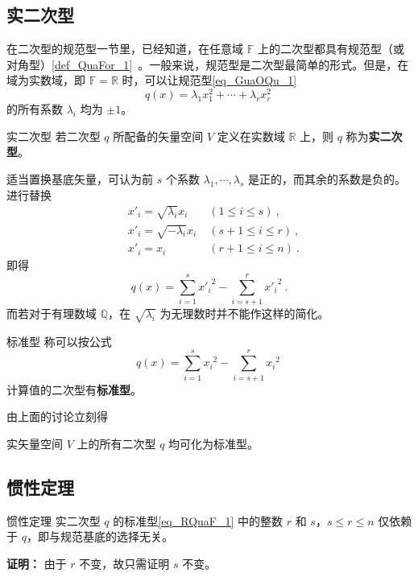 

\subsection{实二次型}
在二次型的规范型一节里，已经知道，在任意域 $\mathbb F$ 上的二次型都具有规范型（或对角型）\autoref{def_QuaFor_1}~。一般来说，规范型是二次型最简单的形式。但是，在域为实数域，即 $\mathbb F=\mathbb R$ 时，可以让规范型\autoref{eq_GuaOQu_1}~
\begin{equation}
q({x})=\lambda_1 x_1^2+\cdots+\lambda_r x_r^2~
\end{equation}
的所有系数 $\lambda_i$ 均为 $\pm 1$。
\begin{definition}{实二次型}
若二次型 $q$ 所配备的矢量空间 $V$ 定义在实数域 $\mathbb R$ 上，则 $q$ 称为\textbf{实二次型}。
\end{definition}
适当置换基底矢量，可认为前 $s$ 个系数 $\lambda_1,\cdots,\lambda_s$ 是正的，而其余的系数是负的。进行替换
\begin{equation}
\begin{aligned}
&x'_i=\sqrt{\lambda_i}x_i\;&(1\leq i\leq s)~,\\
&x'_i=\sqrt{-\lambda_i}x_i\;&(s+1\leq i\leq r)~,\\
&x'_i=x_i\; &(r+1\leq i\leq n)~.
\end{aligned}
\end{equation}
 即得
 \begin{equation}
 q({x})=\sum_{i=1}^{s}{x'_i}^2-\sum_{i=s+1}^{r} {x'_{i}}^{2}~.
 \end{equation}
 而若对于有理数域 $\mathbb Q$，在 $\sqrt{\lambda_i}$ 为无理数时并不能作这样的简化。
 
\begin{definition}{标准型}
称可以按公式
\begin{equation}\label{eq_RQuaF_1}
q( x)=\sum_{i=1}^{s}{x_i}^2-\sum_{i=s+1}^{r} {x_{i}}^{2}~
\end{equation}
计算值的二次型有\textbf{标准型}。
\end{definition}
由上面的讨论立刻得
\begin{theorem}{}\label{the_RQuaF_1}
实矢量空间 $V$ 上的所有二次型 $q$ 均可化为标准型。
\end{theorem}
\subsection{惯性定理}
\begin{theorem}{惯性定理}
实二次型 $q$ 的标准型\autoref{eq_RQuaF_1} 中的整数 $r$ 和 $s$，$s\leq r\leq n$ 仅依赖于 $q$，即与规范基底的选择无关。
\end{theorem}
\textbf{证明：} 由于 $r$ 不变，故只需证明 $s$ 不变。

